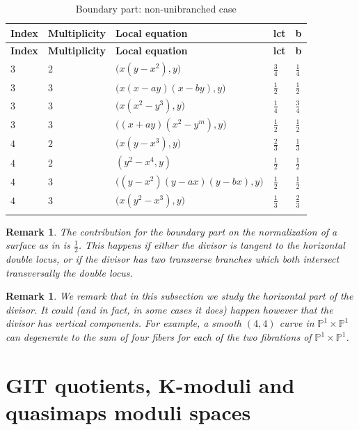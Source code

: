 \documentclass[a4paper,12pt]{amsart}
\newcommand{\bP}{{\mathbb P}}
\newtheorem{remark}[theorem]{Remark}
\theoremstyle{definition}
\theoremstyle{remark}
\begin{document}
\renewcommand{\arraystretch}{1.5}
\begin{longtable}{| p{} | p{} | p{} | p{} | p{} |}

\hline
\textbf{Index} & \textbf{Multiplicity} & \textbf{Local equation} & \textbf{lct} & \textbf{b} \\ \hline
\endfirsthead
\hline
\textbf{Index} & \textbf{Multiplicity} & \textbf{Local equation} & \textbf{lct} & \textbf{b} \\ \hline
\endhead
$3$ & $2$ & $\big(x(y-x^2),y\big)$ & $\tfrac{3}{4}$ & $\tfrac{1}{4}$ \\ \hline
$3$ & $3$ & $\big(x(x-ay)(x-by),y\big)$ & $\tfrac{1}{2}$ & $\tfrac{1}{2}$ \\ \hline
$3$ & $3$ & $\big(x(x^2-y^3),y\big)$ & $\tfrac{1}{4}$ & $\tfrac{3}{4}$ \\ \hline
$3$ & $3$ & $\big((x+ay)(x^2-y^m),y\big)$ & $\tfrac{1}{2}$ & $\tfrac{1}{2}$ \\ \hline
$4$ & $2$ & $\big(x(y-x^3),y\big)$ & $\tfrac{2}{3}$ & $\tfrac{1}{3}$ \\ \hline
$4$ & $2$ & $(y^2-x^4,y)$ & $\tfrac{1}{2}$ & $\tfrac{1}{2}$ \\ \hline
$4$ & $3$ & $\big((y-x^2)(y-ax)(y-bx),y\big)$ & $\tfrac{1}{2}$ & $\tfrac{1}{2}$ \\ \hline
$4$ & $3$ & $\big(x(y^2-x^3),y\big)$ & $\tfrac{1}{3}$ & $\tfrac{2}{3}$ \\ \hline
\caption{Boundary part: non-unibranched case} 
\end{longtable}
\begin{remark}
    The contribution for the boundary part on the normalization of a surface as in  is $\frac{1}{2}$. This happens if either the divisor is tangent to the horizontal double locus, or if the divisor has two transverse branches which both intersect transversally the double locus.
\end{remark}

\begin{remark}
    We remark that in this subsection we study the horizontal part of the divisor. It could (and in fact, in some cases it does) happen however that the divisor has vertical components. For example, a smooth $(4,4)$ curve in $\bP^1\times\bP^1$ can degenerate to the sum of four fibers for each of the two fibrations of $\bP^1\times \bP^1$. 
\end{remark}

\section{GIT quotients, K-moduli and quasimaps moduli spaces}\label{section_example_14_case}
\end{document}
